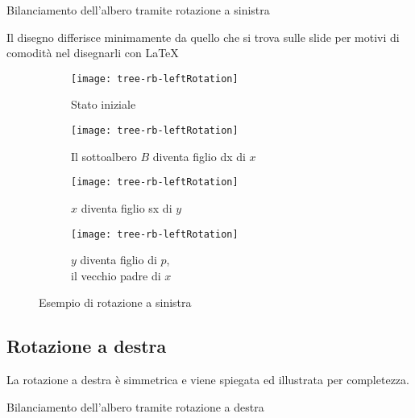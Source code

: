\begin{algorithm}[H]
	\caption{Bilanciamento dell'albero tramite rotazione a sinistra}
	\setcounter{AlgoLine}{0}
	
\end{algorithm}

\begin{note}
Il disegno differisce minimamente da quello che si trova sulle slide per motivi di comodità nel disegnarli con \LaTeX{}
\end{note}
\begin{figure}[H]
	\renewcommand\thesubfigure{\arabic{subfigure}}
	\begin{subfigure}[t]{.23\linewidth}
		\texttt{[image: tree-rb-leftRotation]}
		\caption{Stato iniziale}
	\end{subfigure}\hfill
	\begin{subfigure}[t]{.23\linewidth}
		\texttt{[image: tree-rb-leftRotation]}
		\caption{Il sottoalbero \(B\) diventa figlio dx di \(x\)}
	\end{subfigure}\hfill
	\begin{subfigure}[t]{.23\linewidth}
		\texttt{[image: tree-rb-leftRotation]}
		\caption{\(x\) diventa figlio sx di \(y\)}
	\end{subfigure}\hfill
	\begin{subfigure}[t]{.23\linewidth}
		\texttt{[image: tree-rb-leftRotation]}
		\caption{\(y\) diventa figlio di \(p\),\\il vecchio padre di \(x\)}
	\end{subfigure}
	\caption{Esempio di rotazione a sinistra}
\end{figure}
\clearpage
\subsection*{Rotazione a destra}

La rotazione a destra è simmetrica e viene spiegata ed illustrata per completezza.

\begin{algorithm}[H]
	\caption{Bilanciamento dell'albero tramite rotazione a destra}
	\setcounter{AlgoLine}{0}
	
\end{algorithm}

